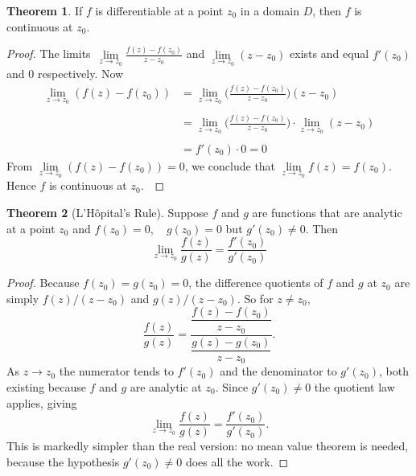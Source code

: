 \documentclass[11pt,a4paper]{article}
\theoremstyle{definition}
\newtheorem{thm}{Theorem}[section]
\begin{document}
\begin{thm}
If $f$ is differentiable at a point $z_0$ in a domain $D$, then $f$ is continuous at $z_0$.
\end{thm}

\begin{proof}
The limits $\,\lim\limits_{z \rightarrow z_0} \frac{f(z) - f(z_0)}{z - z_0}$ and $\lim\limits_{z \rightarrow z_0} (z - z_0)$ exists and equal $f'(z_0)$ and 0 respectively. Now
\begin{align*}
\lim\limits_{z \rightarrow z_0} (f(z) - f(z_0)) & = \lim\limits_{z \rightarrow z_0} \Big(\frac{f(z) - f(z_0)}{z - z_0}\Big)(z - z_0)\\\\
& = \lim\limits_{z \rightarrow z_0} \Big(\frac{f(z) - f(z_0)}{z - z_0}\Big)\cdot \lim\limits_{z \rightarrow z_0} (z - z_0)\\\\
& = f'(z_0) \cdot 0 = 0
\end{align*}
From $\lim\limits_{z \rightarrow z_0} (f(z) - f(z_0)) = 0$, we conclude that $\lim\limits_{z \rightarrow z_0} f(z) = f(z_0)$. Hence $f$ is continuous at $z_0$.\
\end{proof}

\begin{thm}[L'H\^opital's Rule]
Suppose $f$ and $g$ are functions that are analytic at a point $z_0$ and $f(z_0) = 0,\quad  g(z_0) = 0$ but $g'(z_0) \neq 0$. Then  
$$\lim\limits_{z \rightarrow z_0} \frac{f(z)}{g(z)} = \frac{f'(z_0)}{g'(z_0)}$$
\end{thm}

\begin{proof}
Because $f(z_0)=g(z_0)=0$, the difference quotients of $f$ and $g$ at $z_0$ are
simply $f(z)/(z-z_0)$ and $g(z)/(z-z_0)$. So for $z\neq z_0$,
$$\frac{f(z)}{g(z)}
=\frac{\dfrac{f(z)-f(z_0)}{z-z_0}}{\dfrac{g(z)-g(z_0)}{z-z_0}} .$$
As $z\rightarrow z_0$ the numerator tends to $f'(z_0)$ and the denominator to
$g'(z_0)$, both existing because $f$ and $g$ are analytic at $z_0$. Since
$g'(z_0)\neq 0$ the quotient law applies, giving
$$\lim_{z\rightarrow z_0}\frac{f(z)}{g(z)}=\frac{f'(z_0)}{g'(z_0)} .$$
This is markedly simpler than the real version: no mean value theorem is
needed, because the hypothesis $g'(z_0)\neq 0$ does all the work.
\end{proof}
\end{document}
